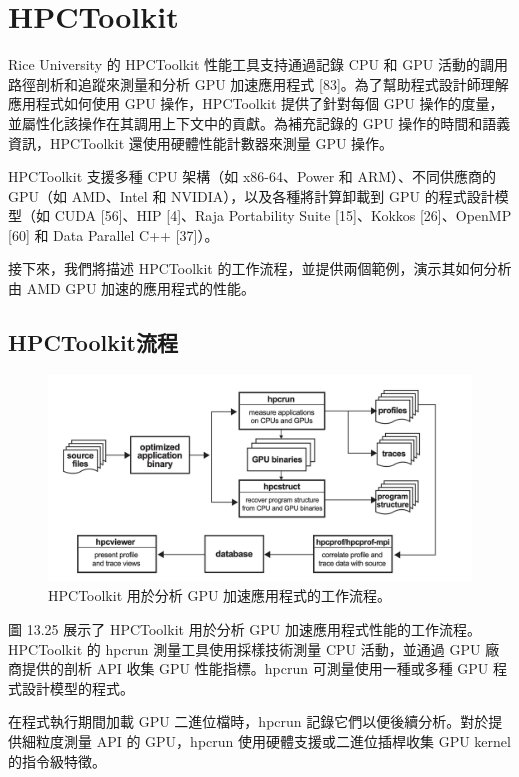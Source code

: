 \section{HPCToolkit}

Rice University 的 HPCToolkit 性能工具支持通過記錄 CPU 和 GPU 活動的調用路徑剖析和追蹤來測量和分析 GPU 加速應用程式 [83]。為了幫助程式設計師理解應用程式如何使用 GPU 操作，HPCToolkit 提供了針對每個 GPU 操作的度量，並屬性化該操作在其調用上下文中的貢獻。為補充記錄的 GPU 操作的時間和語義資訊，HPCToolkit 還使用硬體性能計數器來測量 GPU 操作。

HPCToolkit 支援多種 CPU 架構（如 x86-64、Power 和 ARM）、不同供應商的 GPU（如 AMD、Intel 和 NVIDIA），以及各種將計算卸載到 GPU 的程式設計模型（如 CUDA [56]、HIP [4]、Raja Portability Suite [15]、Kokkos [26]、OpenMP [60] 和 Data Parallel C++ [37]）。

接下來，我們將描述 HPCToolkit 的工作流程，並提供兩個範例，演示其如何分析由 AMD GPU 加速的應用程式的性能。


\subsection{HPCToolkit流程}

\begin{figure}
    \centering
    \includegraphics[width=0.9\linewidth]{FileAusiliari/Screenshots/Figure13-25.png}
    \caption{HPCToolkit 用於分析 GPU 加速應用程式的工作流程。}
    \label{fig:PAPI25}
\end{figure}

圖 13.25 展示了 HPCToolkit 用於分析 GPU 加速應用程式性能的工作流程。HPCToolkit 的 hpcrun 測量工具使用採樣技術測量 CPU 活動，並通過 GPU 廠商提供的剖析 API 收集 GPU 性能指標。hpcrun 可測量使用一種或多種 GPU 程式設計模型的程式。

在程式執行期間加載 GPU 二進位檔時，hpcrun 記錄它們以便後續分析。對於提供細粒度測量 API 的 GPU，hpcrun 使用硬體支援或二進位插桿收集 GPU kernel的指令級特徵。

